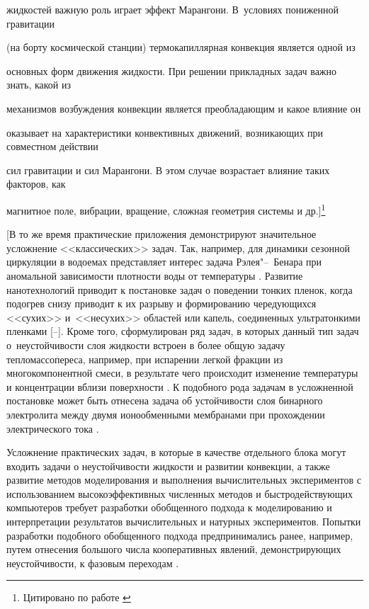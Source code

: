 жидкостей важную роль играет эффект Марангони. В~условиях пониженной гравитации

(на борту космической станции) термокапиллярная конвекция является одной из

основных форм движения жидкости. При решении прикладных задач важно знать, какой из

механизмов возбуждения конвекции является преобладающим и какое влияние он

оказывает на характеристики конвективных движений, возникающих при совместном действии

сил гравитации и сил Марангони. В этом случае возрастает влияние таких факторов, как

магнитное поле, вибрации, вращение, сложная геометрия системы и др.]\footnote{Цитировано по работе \cite[c.~92]{lukashev:add2}}



[В то же время практические приложения демонстрируют значительное усложнение <<классических>> задач. Так, например, для динамики сезонной циркуляции в водоемах представляет интерес задача Рэлея"--~Бенара при аномальной зависимости плотности воды от температуры \cite{lukashev:bib22}. Развитие нанотехнологий приводит к постановке задач о поведении тонких пленок, когда подогрев снизу приводит к их разрыву и формированию чередующихся <<сухих>> и~<<несухих>> областей или капель, соединенных ультратонкими пленками [--]. Кроме того, сформулирован ряд задач, в которых данный тип задач о~неустойчивости слоя жидкости встроен в более общую задачу тепломассопереса, например, при испарении легкой фракции из многокомпонентной смеси, в результате чего происходит изменение температуры и концентрации вблизи поверхности \cite{lukashev:bib5,lukashev:bib27}. К подобного рода задачам в усложненной постановке может быть отнесена задача об устойчивости слоя бинарного электролита между двумя ионообменными мембранами при прохождении электрического тока \cite{lukashev:bib28}.



Усложнение практических задач, в которые в качестве отдельного блока могут входить задачи о неустойчивости жидкости и развитии конвекции, а также развитие методов моделирования и выполнения вычислительных экспериментов с использованием высокоэффективных численных методов и быстродействующих компьютеров требует разработки обобщенного подхода к моделированию и интерпретации результатов вычислительных и натурных экспериментов. Попытки разработки подобного обобщенного подхода предпринимались ранее, например, путем отнесения большого числа кооперативных явлений, демонстрирующих неустойчивости, к фазовым переходам \cite{lukashev:bib29}. 


